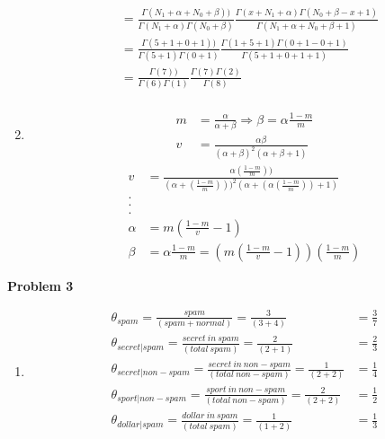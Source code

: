\documentclass[11pt,letterpaper]{article}
\begin{document}
\begin{enumerate}[labelindent=0pt]
\begin{align*}
	&= \frac{\Gamma(N_{1}+\alpha + N_{0}+\beta))}{\Gamma(N_{1}+\alpha)\Gamma(N_{0}+\beta)} \frac{\Gamma(x+N_{1}+\alpha)\Gamma(N_{0}+\beta - x +1)}{\Gamma(N_{1}+\alpha+N_{0}+\beta+1)} \\
	&= \frac{\Gamma(5+1+ 0+1))}{\Gamma(5+1)\Gamma(0+1)} \frac{\Gamma(1+5+1)\Gamma(0+1- 0 +1)}{\Gamma(5+1+0+1+1)} \\
	&= \frac{\Gamma(7))}{\Gamma(6)\Gamma(1)} \frac{\Gamma(7)\Gamma(2)}{\Gamma(8)} \\
	\end{align*}
\item 
	\begin{align*}
	m &= \frac{\alpha}{\alpha+\beta} \Rightarrow \beta = \alpha\frac{1-m}{m}\\
	v &= \frac{\alpha\beta}{(\alpha+\beta)^2(\alpha+\beta+1)}
	\end{align*}
	\begin{align*}
v &= \frac{\alpha(\frac{1-m}{m}))}{(\alpha+(\frac{1-m}{m})))^2(\alpha+(\alpha(\frac{1-m}{m}))+1)}\\
.\\
.\\
.\\
\alpha &= m\left(\frac{1-m}{v}-1\right)\\
\beta &= \alpha\frac{1-m}{m}=\left( m\left(\frac{1-m}{v}-1\right)\right)\left(\frac{1-m}{m}\right)
	\end{align*}
\end{enumerate}

\textbf{Problem 3}
\begin{enumerate}[labelindent=0pt]
\item 
	\begin{align*}
	\theta_{spam} = \frac{spam}{(spam + normal)} = \frac{3}{(3+4)} &=
\frac{3}{7} 
\\
	\theta_{secret|spam} = \frac{secret~ in~ spam}{(total~ spam)} =
\frac{2}{(2+1)} &= \frac{2}{3}
\\
	\theta_{secret|non-spam} = \frac{secret~ in~ non-spam}{(total~ non-spam)} =
\frac{1}{(2+2)} &= \frac{1}{4}
\\
	\theta_{sport|non-spam} = \frac{sport~ in~ non-spam}{(total~ non-spam)} =
\frac{2}{(2+2)} &= \frac{1}{2}
\\
	\theta_{dollar|spam} = \frac{dollar~ in~ spam}{(total~ spam)} =
\frac{1}{(1+2)} &= \frac{1}{3}
\\
	\end{align*}
\end{enumerate}
\end{document}
